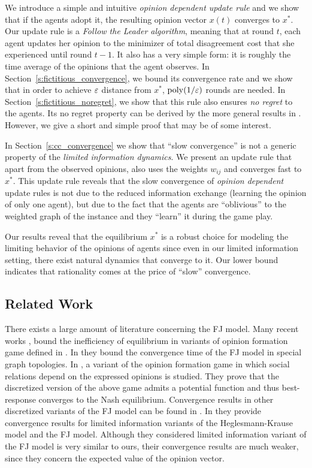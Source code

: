 We introduce a simple and intuitive \emph{opinion dependent update rule} and we
show that if the agents adopt it, the resulting opinion vector $x(t)$ converges
to $x^*$.  Our update rule is a \emph{Follow the Leader algorithm}, meaning that
at round $t$, each agent updates her
opinion to the minimizer of total disagreement cost that she experienced until
round $t-1$.  It also has a very simple form: it is roughly the time average of
the opinions that the agent observes.  In Section~\ref{s:fictitious_convergence},
we bound its convergence rate and we show that in order to achieve $\varepsilon$ distance
from $x^*$, $\mathrm{poly}(1/\varepsilon)$ rounds are needed.  In Section~\ref{s:fictitious_noregret},
we show that this rule also ensures \emph{no regret} to the agents.  Its no regret
property can be derived by the more general results in \cite{HAK07}.  However, we
give a short and simple proof that may be of some interest.

In Section~\ref{s:cc_convergence} we show that \enquote{slow convergence} is
not a generic property of the \emph{limited information dynamics}.  We present
an update rule that apart from the observed opinions, also uses the weights
$w_{ij}$ and converges fast to $x^*$.  This update rule reveals
that the slow convergence of \emph{opinion dependent} update rules is not due
to the reduced information exchange (learning the opinion of only one agent),
but due to the fact that the agents are \enquote{oblivious} to the weighted
graph of the instance and they \enquote{learn} it during the game play.

Our results reveal that the equilibrium $x^*$ is a robust choice for modeling the
limiting behavior of the opinions of agents since even in our limited information
setting, there exist natural dynamics that converge to it.  Our lower bound
indicates that rationality comes at the price of \enquote{slow} convergence.

\subsection{Related Work}

There exists a large amount of literature concerning the FJ model.  Many recent
works \cite{BGM13,CKO13}, \cite{BFM16,EFHS17} bound the inefficiency of
equilibrium in variants of opinion formation game defined in \cite{BKO11}. In
\cite{GS14} they bound the convergence time of the FJ model in special graph
topologies.  In \cite{BFM16}, a variant of the opinion formation game in which
social relations depend on the expressed opinions is studied.  They prove that
the discretized version of the above game admits a potential function and thus
best-response converges to the Nash equilibrium.  Convergence results in other
discretized variants of the FJ model can be found in \cite{YOASS13,FGV16}. In
\cite{FPS16} they provide convergence results for limited information variants
of the Heglesmann-Krause model \cite{HK} and the FJ model. Although they
considered limited information variant of the FJ model is very similar to ours,
their convergence results are much weaker, since they concern the expected
value of the opinion vector.

